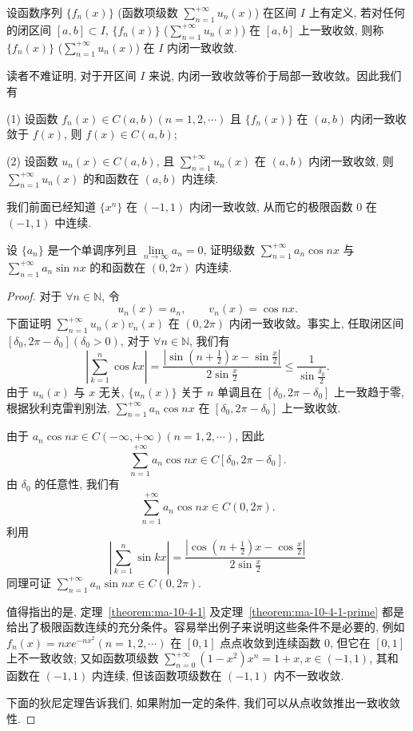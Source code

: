 \begin{definition}\label{definition:ma-10-4-1}
设函数序列 $\{f_n(x)\}$ (函数项级数 $\sum\limits_{n=1}^{+\infty}u_n(x)$) 在区间 $I$ 上有定义, 若对任何的闭区间 $[a,b]\subset I$, $\{f_n(x)\}$ ($\sum\limits_{n=1}^{+\infty}u_n(x)$) 在 $[a,b]$ 上一致收敛, 则称 $\{f_n(x)\}$ ($\sum\limits_{n=1}^{+\infty}u_n(x)$) 在 $I$ 内闭一致收敛.
\end{definition}

读者不难证明, 对于开区间 $I$ 来说, 内闭一致收敛等价于局部一致收敛。因此我们有

\begin{corollary}\label{corollary:ma-10-source-51}
(1) 设函数 $f_n(x)\in C(a,b)(n=1,2,\cdots)$ 且 $\{f_n(x)\}$ 在 $(a,b)$ 内闭一致收敛于 $f(x)$, 则 $f(x)\in C(a,b)$;

(2) 设函数 $u_n(x)\in C(a,b)$, 且 $\sum\limits_{n=1}^{+\infty}u_n(x)$ 在 $(a,b)$ 内闭一致收敛, 则 $\sum\limits_{n=1}^{+\infty}u_n(x)$ 的和函数在 $(a,b)$ 内连续.
\end{corollary}

我们前面已经知道 $\{x^n\}$ 在 $(-1,1)$ 内闭一致收敛, 从而它的极限函数 $0$ 在 $(-1,1)$ 中连续.

\begin{example}\label{example:ma-10-4-1}
设 $\{a_n\}$ 是一个单调序列且 $\lim\limits_{n\to\infty}a_n=0$, 证明级数 $\sum\limits_{n=1}^{+\infty}a_n\cos nx$ 与 $\sum\limits_{n=1}^{+\infty}a_n\sin nx$ 的和函数在 $(0,2\pi)$ 内连续.
\end{example}


\begin{proof}
对于 $\forall n\in\mathbb N$, 令
\[
  u_n(x)=a_n,\qquad v_n(x)=\cos nx.
\]
下面证明 $\sum\limits_{n=1}^{+\infty}u_n(x)v_n(x)$ 在 $(0,2\pi)$ 内闭一致收敛。事实上, 任取闭区间 $[\delta_0,2\pi-\delta_0](\delta_0>0)$, 对于 $\forall n\in\mathbb N$, 我们有
\[
  \left|\sum_{k=1}^n\cos kx\right|
  =\frac{\left|\sin\left(n+\frac12\right)x-\sin\frac{x}{2}\right|}{2\sin\frac{x}{2}}
  \leq\frac1{\sin\frac{\delta_0}{2}}.
\]
由于 $u_n(x)$ 与 $x$ 无关, $\{u_n(x)\}$ 关于 $n$ 单调且在 $[\delta_0,2\pi-\delta_0]$ 上一致趋于零, 根据狄利克雷判别法, $\sum\limits_{n=1}^{+\infty}a_n\cos nx$ 在 $[\delta_0,2\pi-\delta_0]$ 上一致收敛.

由于 $a_n\cos nx\in C(-\infty,+\infty)(n=1,2,\cdots)$, 因此
\[
  \sum_{n=1}^{+\infty}a_n\cos nx\in C[\delta_0,2\pi-\delta_0].
\]
由 $\delta_0$ 的任意性, 我们有
\[
  \sum_{n=1}^{+\infty}a_n\cos nx\in C(0,2\pi).
\]
利用
\[
  \left|\sum_{k=1}^n\sin kx\right|
  =\frac{\left|\cos\left(n+\frac12\right)x-\cos\frac{x}{2}\right|}{2\sin\frac{x}{2}}
\]
同理可证 $\sum\limits_{n=1}^{+\infty}a_n\sin nx\in C(0,2\pi)$.

值得指出的是, 定理~\ref{theorem:ma-10-4-1} 及定理~\ref{theorem:ma-10-4-1-prime} 都是给出了极限函数连续的充分条件。容易举出例子来说明这些条件不是必要的, 例如 $f_n(x)=nxe^{-nx^2}(n=1,2,\cdots)$ 在 $[0,1]$ 点点收敛到连续函数 $0$, 但它在 $[0,1]$ 上不一致收敛; 又如函数项级数 $\sum\limits_{n=0}^{+\infty}(1-x^2)x^n=1+x, x\in(-1,1)$, 其和函数在 $(-1,1)$ 内连续, 但该函数项级数在 $(-1,1)$ 内不一致收敛.

下面的狄尼定理告诉我们, 如果附加一定的条件, 我们可以从点收敛推出一致收敛性.
\end{proof}


